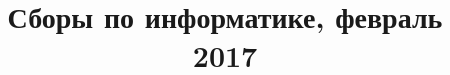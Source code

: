 \documentclass[utf8,xcolor=table,14pt]{beamer}
\begin{document}
\title{Сборы по информатике, февраль 2017}

\end{document}

